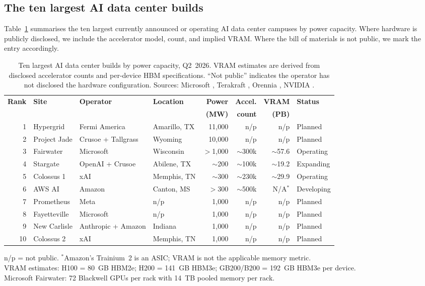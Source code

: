 \documentclass[12pt]{article}
\theoremstyle{definition}
\begin{document}
\subsection{The ten largest AI data center builds}

Table~\ref{tab:datacenters} summarises the ten largest currently announced or operating AI data center campuses by power capacity. Where hardware is publicly disclosed, we include the accelerator model, count, and implied VRAM. Where the bill of materials is not public, we mark the entry accordingly.

\begin{table}[H]
\centering
\caption{Ten largest AI data center builds by power capacity, Q2~2026. VRAM estimates are derived from disclosed accelerator counts and per-device HBM specifications. ``Not public'' indicates the operator has not disclosed the hardware configuration. Sources: Microsoft \cite{MSFairwater2025}, Terakraft \cite{Terakraft2026}, Orennia \cite{Orennia2026}, NVIDIA \cite{NVIDIASuperpod2024}.}
\label{tab:datacenters}
\small
\begin{tabular}{@{}rlllrrrl@{}}
\toprule
\textbf{Rank} & \textbf{Site} & \textbf{Operator} & \textbf{Location} & \textbf{Power} & \textbf{Accel.} & \textbf{VRAM} & \textbf{Status} \\
 & & & & \textbf{(MW)} & \textbf{count} & \textbf{(PB)} & \\
\midrule
1 & Hypergrid & Fermi America & Amarillo, TX & 11{,}000 & n/p & n/p & Planned \\
2 & Project Jade & Crusoe + Tallgrass & Wyoming & 10{,}000 & n/p & n/p & Planned \\
3 & Fairwater & Microsoft & Wisconsin & $>$1{,}000 & $\sim$300k & $\sim$57.6 & Operating \\
4 & Stargate & OpenAI + Crusoe & Abilene, TX & $\sim$200 & $\sim$100k & $\sim$19.2 & Expanding \\
5 & Colossus 1 & xAI & Memphis, TN & $\sim$300 & $\sim$230k & $\sim$29.9 & Operating \\
6 & AWS AI & Amazon & Canton, MS & $>$300 & $\sim$500k & N/A$^*$ & Developing \\
7 & Prometheus & Meta & n/p & 1{,}000 & n/p & n/p & Planned \\
8 & Fayetteville & Microsoft & n/p & 1{,}000 & n/p & n/p & Planned \\
9 & New Carlisle & Anthropic + Amazon & Indiana & 1{,}000 & n/p & n/p & Planned \\
10 & Colossus 2 & xAI & Memphis, TN & 1{,}000 & n/p & n/p & Planned \\
\bottomrule
\end{tabular}

\medskip
\footnotesize n/p = not public. $^*$Amazon's Trainium~2 is an ASIC; VRAM is not the applicable memory metric. \\
VRAM estimates: H100 = 80~GB HBM2e; H200 = 141~GB HBM3e; GB200/B200 = 192~GB HBM3e per device. \\
Microsoft Fairwater: 72 Blackwell GPUs per rack with 14~TB pooled memory per rack.
\end{table}
\end{document}

